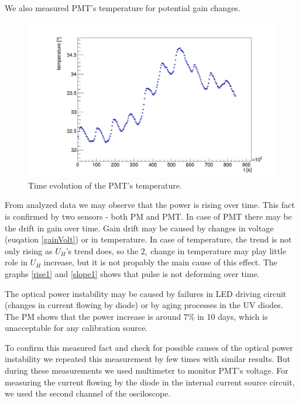 We also measured PMT's temperature for potential gain changes.
 
\begin{figure}[H]
 \centering
 \includegraphics[scale=0.3]{./pictures/temperatures}
 \caption{Time evolution of the PMT's temperature.}
 \label{temp1}
\end{figure}

From analyzed data we may observe that the power is rising over time. This fact is confirmed by two sensors - both PM and PMT. In case of PMT there may be the drift in gain over time. Gain drift may be caused by changes in voltage (euqation \ref{gainVolt}) or in temperature. In case of temperature, the trend is not only rising as $U_{H}$'s trend does, so the $2_{\circ}$ change in temperature may play little role in $U_{H}$ increase, but it is not propably the main cause of this effect.
The graphs \ref{rise1} and \ref{slope1} shows that pulse is not deforming over time.
\par
The optical power instability may be caused by failures in LED driving circuit (changes in current flowing by diode) or by aging processes in the UV diodes. The PM shows that the power increase is around $7 \%$ in 10 days, which is unacceptable for any calibration source. 
\par
To confirm this measured fact and check for possible causes of the optical power instability we repeated this measurement by few times with similar results. But during these measurements we used multimeter to monitor PMT's voltage. For measuring the current flowing by the diode in the internal current source circuit, we used the second channel of the osciloscope.

